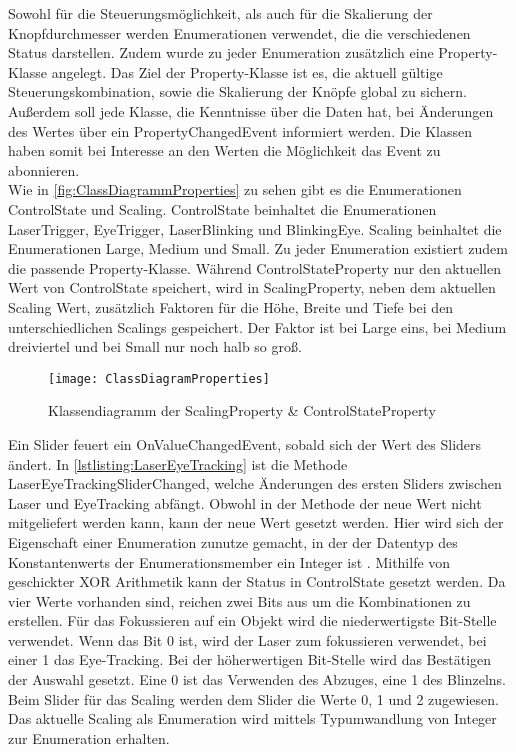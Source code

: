 Sowohl für die Steuerungsmöglichkeit, als auch für die Skalierung der Knopfdurchmesser werden Enumerationen verwendet, die die verschiedenen Status darstellen. Zudem wurde zu jeder Enumeration zusätzlich eine Property-Klasse angelegt. Das Ziel der Property-Klasse ist es, die aktuell gültige Steuerungskombination, sowie die Skalierung der Knöpfe global zu sichern. Außerdem soll jede Klasse, die Kenntnisse über die Daten hat, bei Änderungen des Wertes über ein {\ttfamily PropertyChangedEvent} informiert werden. Die Klassen haben somit bei Interesse an den Werten die Möglichkeit das Event zu abonnieren. \\
Wie in \autoref{fig:ClassDiagrammProperties} zu sehen gibt es die Enumerationen {\ttfamily ControlState} und {\ttfamily Scaling}. ControlState beinhaltet die Enumerationen LaserTrigger, EyeTrigger, LaserBlinking und BlinkingEye. Scaling beinhaltet die Enumerationen Large, Medium und Small. Zu jeder Enumeration existiert zudem die passende Property-Klasse. Während {\ttfamily ControlStateProperty} nur den aktuellen Wert von ControlState speichert, wird in {\ttfamily ScalingProperty}, neben dem aktuellen Scaling Wert, zusätzlich Faktoren für die Höhe, Breite und Tiefe bei den unterschiedlichen Scalings gespeichert. Der Faktor ist bei Large eins, bei Medium dreiviertel und bei Small nur noch halb so groß.

\begin{figure}[!htbp]
	\centering
	\texttt{[image: ClassDiagramProperties]}
	\caption[Klassendiagramm der ScalingProperty \& ControlStateProperty]{Klassendiagramm der ScalingProperty \& ControlStateProperty}
	\label{fig:ClassDiagrammProperties}
\end{figure}

Ein Slider feuert ein {\ttfamily OnValueChangedEvent}, sobald sich der Wert des Sliders ändert. In \autoref{lstlisting:LaserEyeTracking} ist die Methode {\ttfamily LaserEyeTrackingSliderChanged}, welche Änderungen des ersten Sliders zwischen Laser und EyeTracking abfängt. Obwohl in der Methode der neue Wert nicht mitgeliefert werden kann, kann der neue Wert gesetzt werden. Hier wird sich der Eigenschaft einer Enumeration zunutze gemacht, in der der Datentyp des Konstantenwerts der Enumerationsmember ein Integer ist \cite{BillWagner.2020}. Mithilfe von geschickter XOR Arithmetik kann der Status in ControlState gesetzt werden. Da vier Werte vorhanden sind, reichen zwei Bits aus um die Kombinationen zu erstellen. Für das Fokussieren auf ein Objekt wird die niederwertigste Bit-Stelle verwendet. Wenn das Bit 0 ist, wird der Laser zum fokussieren verwendet, bei einer 1 das Eye-Tracking. Bei der höherwertigen Bit-Stelle wird das Bestätigen der Auswahl gesetzt. Eine 0 ist das Verwenden des Abzuges, eine 1 des Blinzelns. Beim Slider für das Scaling werden dem Slider die Werte 0, 1 und 2 zugewiesen. Das aktuelle Scaling als Enumeration wird mittels Typumwandlung von Integer zur Enumeration erhalten.


